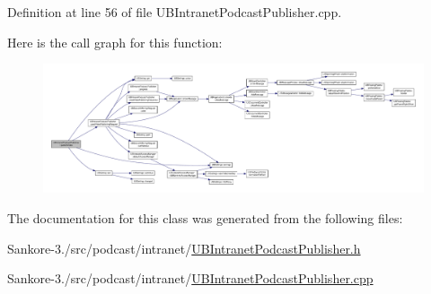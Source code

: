 Definition at line 56 of file U\-B\-Intranet\-Podcast\-Publisher.\-cpp.



Here is the call graph for this function\-:
\nopagebreak
\begin{figure}[H]
\begin{center}
\leavevmode
\includegraphics[width=350pt]{dc/d9f/class_u_b_intranet_podcast_publisher_a4965ecc747e29ef3c2a180d4078e1fbd_cgraph}
\end{center}
\end{figure}




The documentation for this class was generated from the following files\-:\begin{DoxyCompactItemize}
\item 
Sankore-\/3./src/podcast/intranet/\hyperlink{_u_b_intranet_podcast_publisher_8h}{U\-B\-Intranet\-Podcast\-Publisher.\-h}\item 
Sankore-\/3./src/podcast/intranet/\hyperlink{_u_b_intranet_podcast_publisher_8cpp}{U\-B\-Intranet\-Podcast\-Publisher.\-cpp}\end{DoxyCompactItemize}
